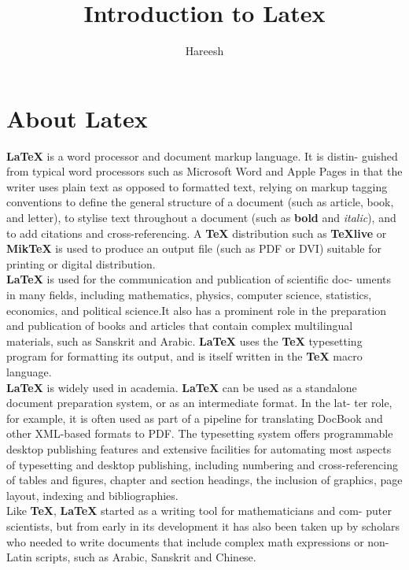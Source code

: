\documentclass[12pt]{article}
\title{\textbf{ Introduction to Latex}}
\author{ Hareesh }
\begin{document}
\maketitle
\newpage

\tableofcontents
\newpage


\section {About Latex}
\textbf{ LaTeX }  is a word processor and document markup language. It is distin-
guished from typical word processors such as Microsoft Word and Apple
Pages in that the writer uses plain text as opposed to formatted text, relying
on markup tagging conventions to define the general structure of a document
(such as article, book, and letter), to stylise text throughout a document
(such as \textbf{ bold } and \textit{italic}), and to add citations and cross-referencing. A \textbf{TeX}
distribution such as \textbf{TeXlive} or \textbf{MikTeX} is used to produce an output file
(such as PDF or DVI) suitable for printing or digital distribution.\\

\textbf{LaTeX} is used for the communication and publication of scientific doc-
uments in many fields, including mathematics, physics, computer science,
statistics, economics, and political science.It also has a prominent role in
the preparation and publication of books and articles that contain complex
multilingual materials, such as Sanskrit and Arabic. \textbf{LaTeX} uses the \textbf{TeX}
typesetting program for formatting its output, and is itself written in the
\textbf{TeX} macro language.\\

\textbf{LaTeX} is widely used in academia. \textbf{LaTeX} can be used as a standalone
document preparation system, or as an intermediate format. In the lat-
ter role, for example, it is often used as part of a pipeline for translating
DocBook and other XML-based formats to PDF. The typesetting system
offers programmable desktop publishing features and extensive facilities for
automating most aspects of typesetting and desktop publishing, including
numbering and cross-referencing of tables and figures, chapter and section
headings, the inclusion of graphics, page layout, indexing and bibliographies.\\

Like \textbf{TeX}, \textbf{LaTeX} started as a writing tool for mathematicians and com-
puter scientists, but from early in its development it has also been taken
up by scholars who needed to write documents that include complex math
expressions or non-Latin scripts, such as Arabic, Sanskrit and Chinese.\\
\end{document}
